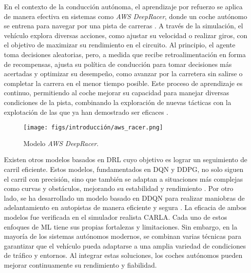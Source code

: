 En el contexto de la conducción autónoma, el aprendizaje por refuerzo se aplica de manera efectiva en sistemas como \textit{AWS DeepRacer}, donde un coche autónomo se entrena para navegar por una pista de carreras \cite{tfg-aws, tfg-aws-carla}. A través de la simulación, el vehículo explora diversas acciones, como ajustar su velocidad o realizar giros, con el objetivo de maximizar su rendimiento en el circuito. Al principio, el agente toma decisiones aleatorias, pero, a medida que recibe retroalimentación en forma de recompensas, ajusta su política de conducción para tomar decisiones más acertadas y optimizar su desempeño, como avanzar por la carretera sin salirse o completar la carrera en el menor tiempo posible. Este proceso de aprendizaje es continuo, permitiendo al coche mejorar su capacidad para manejar diversas condiciones de la pista, combinando la exploración de nuevas tácticas con la explotación de las que ya han demostrado ser eficaces \cite{aws-deep-racer}.

\begin{figure}[ht]
\begin{center}
\texttt{[image: figs/introducción/aws\_racer.png]}
\end{center}
\caption{Modelo \textit{AWS DeepRacer}.}
\label{fig:aws}
\end{figure}

\newpage

Existen otros modelos basados en \ac{DRL} cuyo objetivo es lograr un seguimiento de carril eficiente. Estos modelos, fundamentados en \ac{DQN} y \ac{DDPG}, no solo siguen el carril con precisión, sino que también se adaptan a situaciones más complejas como curvas y obstáculos, mejorando su estabilidad y rendimiento \cite{sigue-carril}. Por otro lado, se ha desarrollado un modelo basado en \ac{DDQN} para realizar maniobras de adelantamiento en autopistas de manera eficiente y segura \cite{adelantamiento}. La eficacia de ambos modelos fue verificada en el simulador realista CARLA. Cada uno de estos enfoques de \ac{ML} tiene sus propias fortalezas y limitaciones. Sin embargo, en la mayoría de los sistemas autónomos modernos, se combinan varias técnicas para garantizar que el vehículo pueda adaptarse a una amplia variedad de condiciones de tráfico y entornos. Al integrar estas soluciones, los coches autónomos pueden mejorar continuamente su rendimiento y fiabilidad.

